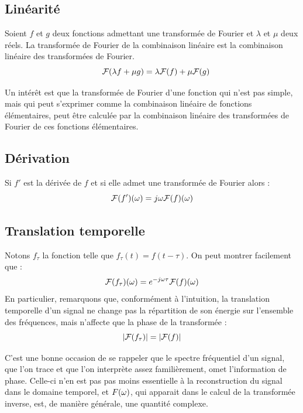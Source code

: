 \subsection{Linéarité}

Soient $f$ et $g$ deux fonctions admettant une transformée de Fourier et $\lambda$ et $\mu$ deux réels. La transformée de Fourier de la combinaison linéaire est la combinaison linéaire des transformées de Fourier.
\begin{equation} \label{transfo-linearite}
\quad {\cal F}(\lambda f+\mu g)=\lambda {\cal F}(f)+\mu {\cal F}(g)
\end{equation}

Un intérêt est que la transformée de Fourier d'une fonction qui n'est pas simple, mais qui peut s'exprimer comme la combinaison linéaire de fonctions élémentaires, peut être calculée par la combinaison linéaire des transformées de Fourier de ces fonctions élémentaires.


\subsection{Dérivation}
Si $f'$ est la dérivée de $f$ et si elle admet une transformée de Fourier alors :
\begin{equation} \label{transfo-derivation}
  {\cal F}(f')(\omega)=j\omega {\cal F}(f)(\omega)
\end{equation}


\subsection{Translation temporelle}
\label{signalretard}
Notons $f_\tau$ la fonction telle que $f_\tau(t) = f(t-\tau)$.
%
On peut montrer facilement que :
\begin{equation} \label{transfo-translation}
{\cal F}(f_\tau)(\omega)=e^{-j\omega\tau} {\cal F}(f)(\omega)
\end{equation}
En particulier, remarquons que, conformément à l'intuition, la translation temporelle d'un signal ne change pas la répartition de son énergie sur l'ensemble des fréquences, mais n'affecte que la phase de la transformée :
\begin{equation}
|{\cal F}(f_\tau)|=|{\cal F}(f)|
\end{equation}

C'est une bonne occasion de se rappeler que le spectre fréquentiel
d'un signal, que l'on trace et que l'on interprète assez
familièrement, omet l'information de phase. Celle-ci n'en est pas pas
moins essentielle à la reconstruction du signal dans le domaine
temporel, et $F(\omega)$, qui apparait dans le calcul de la transformée
inverse, est, de manière générale, une quantité complexe.

